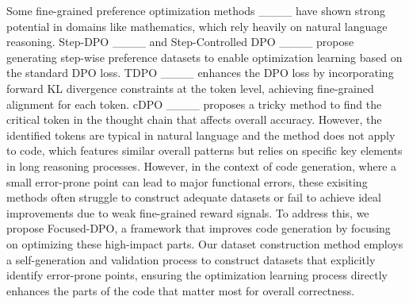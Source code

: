 Some fine-grained preference optimization methods ____ have shown strong potential in domains like mathematics, which rely heavily on natural language reasoning. Step-DPO ____ and Step-Controlled DPO ____ propose generating step-wise preference datasets to enable optimization learning based on the standard DPO loss. TDPO ____ enhances the DPO loss by incorporating forward KL divergence constraints at the token level, achieving fine-grained alignment for each token. cDPO ____ proposes a tricky method to find the critical token in the thought chain that affects overall accuracy. However, the identified tokens are typical in natural language and the method does not apply to code, which features similar overall patterns but relies on specific key elements in long reasoning processes.
However, in the context of code generation, where a small error-prone point can lead to major functional errors, these exisiting methods often struggle to construct adequate datasets or fail to achieve ideal improvements due to weak fine-grained reward signals.
To address this, we propose Focused-DPO, a framework that improves code generation by focusing on optimizing these high-impact parts. 
Our dataset construction method employs a self-generation and validation process to construct datasets that explicitly identify error-prone points, ensuring the optimization learning process directly enhances the parts of the code that matter most for overall correctness.